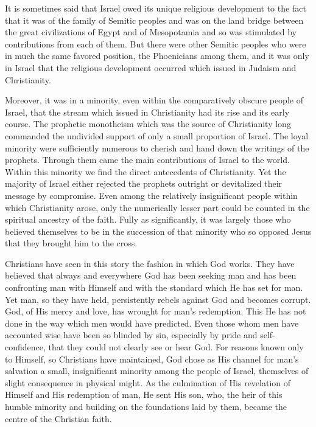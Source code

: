 It is sometimes said that Israel owed its unique religious development to the fact that it was of the family of Semitic peoples and was on the land bridge between the great civilizations of Egypt and of Mesopotamia and so was stimulated by contributions from each of them. But there were other Semitic peoples who were in much the same favored position, the Phoenicians among them, and it was only in Israel that the religious development occurred which issued in Judaism and Christianity.

Moreover, it was in a minority, even within the comparatively obscure people of Israel, that the stream which issued in Christianity had its rise and its early course. The prophetic monotheism which was the source of Christianity long commanded the undivided support of only a small proportion of Israel. The loyal minority were sufficiently numerous to cherish and hand down the writings of the prophets. Through them came the main contributions of Israel to the world. Within this minority we find the direct antecedents of Christianity. Yet the majority of Israel either rejected the prophets outright or devitalized their message by compromise. Even among the relatively insignificant people within which Christianity arose, only the numerically lesser part could be counted in the spiritual ancestry of the faith. Fully as significantly, it was largely those who believed themselves to be in the succession of that minority who so opposed Jesus that they brought him to the cross.

Christians have seen in this story the fashion in which God works. They have believed that always and everywhere God has been seeking man and has been confronting man with Himself and with the standard which He has set for man. Yet man, so they have held, persistently rebels against God and becomes corrupt. God, of His mercy and love, has wrought for man's redemption. This He has not done in the way which men would have predicted. Even those whom men have accounted wise have been so blinded by sin, especially by pride and self-confidence, that they could not clearly see or hear God. For reasons known only to Himself, so Christians have maintained, God chose as His channel for man's salvation a small, insignificant minority among the people of Israel, themselves of slight consequence in physical might. As the culmination of His revelation of Himself and His redemption of man, He sent His son, who, the heir of this humble minority and building on the foundations laid by them, became the centre of the Christian faith.

